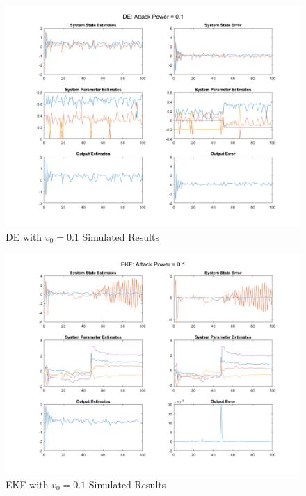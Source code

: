 \documentclass[]{ieeetran}
\begin{document}
\begin{figure}
	\centering
	\includegraphics[width=\linewidth]{../../fig/DE_attack_0_1}
	\caption{DE with $v_0 = 0.1$ Simulated Results}
	\label{fig:deattack001}
\end{figure}

\begin{figure}
	\centering
	\includegraphics[width=\linewidth]{../../fig/EKF_attack_0_1}
	\caption{EKF with $v_0 = 0.1$ Simulated Results}
	\label{fig:ekfattack01}
\end{figure}
\end{document}
